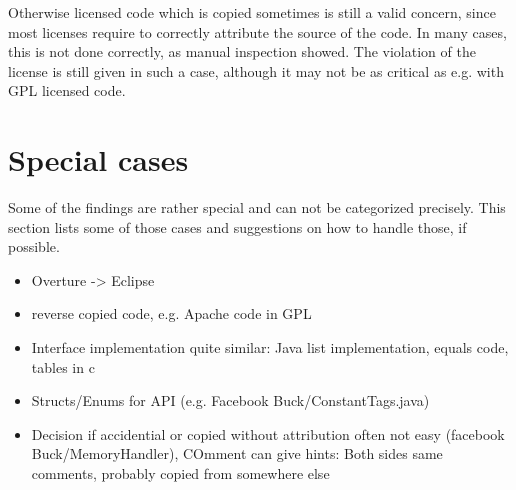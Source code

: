 Otherwise licensed code which is copied sometimes is still a valid concern, since most licenses require to correctly attribute the source of the code.
In many cases, this is not done correctly, as manual inspection showed.
The violation of the license is still given in such a case, although it may not be as critical as e.g. with GPL licensed code.







\section{Special cases}
Some of the findings are rather special and can not be categorized precisely.
This section lists some of those cases and suggestions on how to handle those, if possible.

\begin{itemize}
	\item Overture -> Eclipse
	\item reverse copied code, e.g. Apache code in GPL
	\item Interface implementation quite similar: Java list implementation, equals code, tables in c
	\item Structs/Enums for API (e.g. Facebook Buck/ConstantTags.java)
	\item Decision if accidential or copied without attribution often not easy (facebook Buck/MemoryHandler), COmment can give hints: Both sides same comments, probably copied from somewhere else
\end{itemize}


